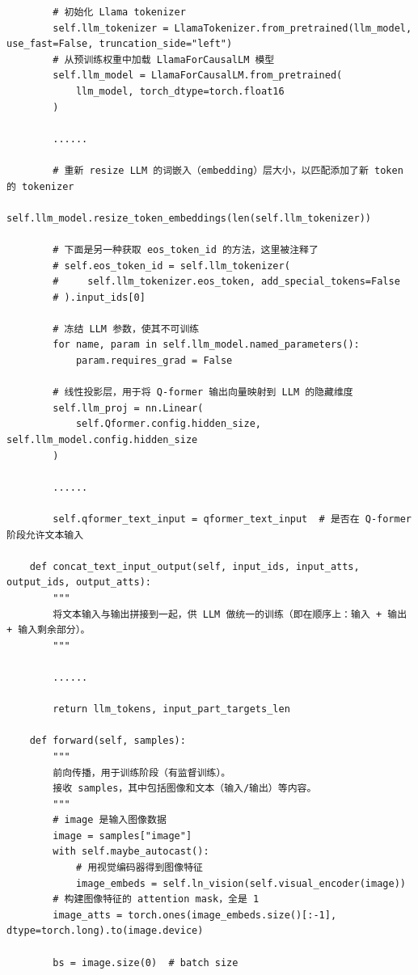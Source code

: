\documentclass[zihao=false,fontset=windows]{ctexart}
\begin{document}
\begin{feishucode}
\begin{lstlisting}
        # 初始化 Llama tokenizer
        self.llm_tokenizer = LlamaTokenizer.from_pretrained(llm_model, use_fast=False, truncation_side="left")
        # 从预训练权重中加载 LlamaForCausalLM 模型
        self.llm_model = LlamaForCausalLM.from_pretrained(
            llm_model, torch_dtype=torch.float16
        )
        
        ......

        # 重新 resize LLM 的词嵌入（embedding）层大小，以匹配添加了新 token 的 tokenizer
        self.llm_model.resize_token_embeddings(len(self.llm_tokenizer))

        # 下面是另一种获取 eos_token_id 的方法，这里被注释了
        # self.eos_token_id = self.llm_tokenizer(
        #     self.llm_tokenizer.eos_token, add_special_tokens=False
        # ).input_ids[0]

        # 冻结 LLM 参数，使其不可训练
        for name, param in self.llm_model.named_parameters():
            param.requires_grad = False

        # 线性投影层，用于将 Q-former 输出向量映射到 LLM 的隐藏维度
        self.llm_proj = nn.Linear(
            self.Qformer.config.hidden_size, self.llm_model.config.hidden_size
        )

        ......

        self.qformer_text_input = qformer_text_input  # 是否在 Q-former 阶段允许文本输入

    def concat_text_input_output(self, input_ids, input_atts, output_ids, output_atts):
        """
        将文本输入与输出拼接到一起，供 LLM 做统一的训练（即在顺序上：输入 + 输出 + 输入剩余部分）。
        """
        
        ......
        
        return llm_tokens, input_part_targets_len

    def forward(self, samples):
        """
        前向传播，用于训练阶段（有监督训练）。
        接收 samples，其中包括图像和文本（输入/输出）等内容。
        """
        # image 是输入图像数据
        image = samples["image"]
        with self.maybe_autocast():
            # 用视觉编码器得到图像特征
            image_embeds = self.ln_vision(self.visual_encoder(image))
        # 构建图像特征的 attention mask，全是 1
        image_atts = torch.ones(image_embeds.size()[:-1], dtype=torch.long).to(image.device)

        bs = image.size(0)  # batch size


\end{lstlisting}
\end{feishucode}
\end{document}
